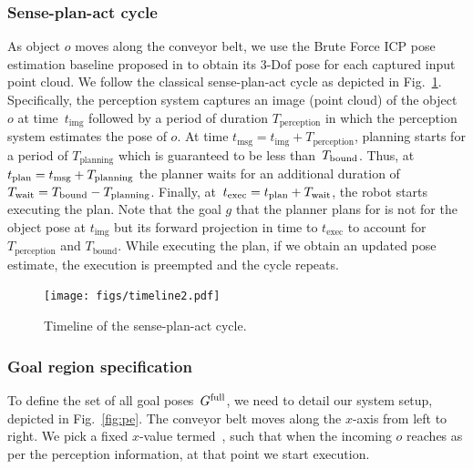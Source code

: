\documentclass[a4paper]{report}
\begin{document}
\subsubsection{Sense-plan-act cycle}
As object $o$ moves along the conveyor belt, we use the Brute Force ICP pose estimation baseline proposed in \cite{perch} to obtain its 3-Dof pose for each captured input point cloud.
We follow the classical sense-plan-act cycle as depicted in Fig.~\ref{fig:tl}.
Specifically, 
the perception system captures an image (point cloud) of the object~$o$ at time~$t_{\textrm{img}}$
followed by a period of duration $T_{\textrm{perception}}$ in which the perception system estimates the pose of $o$.
At time $t_{\textrm{msg}} = t_{\textrm{img}} + T_{\textrm{perception}}$, planning starts for a period of $T_{\textrm{planning}}$ which is guaranteed to be less than~$T_{\textrm{bound}}$.
Thus, at $t_{\textrm{plan}} = t_{\textrm{msg}} + T_{\rm planning}$ the planner waits for an additional duration of $T_{\rm wait} = T_{\textrm{bound}} - T_{\rm planning}$.
Finally, at~$t_{\textrm{exec}} = t_{\textrm{plan}} + T_{\rm wait}$, the robot starts executing the plan. Note that the goal $g$ that the planner plans for is not for the object pose at $t_{\textrm{img}}$ but its forward projection in time to $t_{\textrm{exec}}$ to account for $T_{\textrm{perception}}$ and $T_{\textrm{bound}}$.
While executing the plan, if we obtain an updated pose estimate, the execution is preempted and the cycle repeats.

\begin{figure}[t]
    \centering
    \texttt{[image: figs/timeline2.pdf]}
    \caption{\CaptionTextSize Timeline of the sense-plan-act cycle.}
    \label{fig:tl}
\end{figure}

\subsubsection{Goal region specification}
\label{sec:goal_region}
To define the set of all goal poses~$G^{\textrm{full}}$, we need to detail our system setup, depicted in Fig.~\ref{fig:pe}.
The conveyor belt moves along the $x$-axis from left to right.
We pick a fixed $x$-value termed~\Xexec, such that when the incoming $o$ reaches \Xexec as per the perception information, at that point we start execution.
\end{document}
